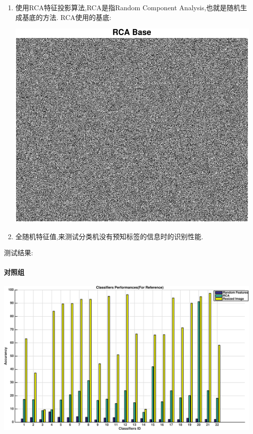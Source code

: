 \begin{enumerate}
	\item 使用RCA特征投影算法,RCA是指Random Component Analysis,也就是随机生成基底的方法. RCA使用的基底: 
			\begin{center}
	\begin{minipage}[t]{\linewidth}
	\center
	{
	\includegraphics[width=\MyFactor\textwidth]{Img/rca_base} 
	}
	\end{minipage}
	\medskip
	\end{center}
	\item 全随机特征值,来测试分类机没有预知标签的信息时的识别性能.

\end{enumerate}

测试结果:

\paragraph{对照组}

	\begin{center}
	\begin{minipage}[t]{\linewidth}
	\center
	{
	\includegraphics[width=\textwidth]{Img/pni_res_ref.pdf} 
	}
	\end{minipage}
	\medskip
	\end{center}
